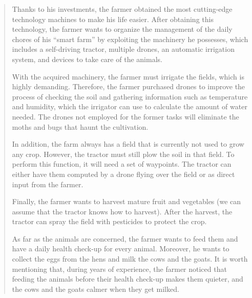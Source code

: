 \begin{quote}
Thanks to his investments, the farmer obtained the most cutting-edge technology machines to make his life easier.
After obtaining this technology, the farmer wants to organize the management of the daily chores of his ``smart farm'' by exploiting the machinery he possesses, which includes a self-driving tractor, multiple drones, an automatic irrigation system, and devices to take care of the animals.

With the acquired machinery, the farmer must irrigate the fields, which is highly demanding.
Therefore, the farmer purchased drones to improve the process of checking the soil and gathering information such as temperature and humidity, which the irrigator can use to calculate the amount of water needed.
The drones not employed for the former tasks will eliminate the moths and bugs that haunt the cultivation.

In addition, the farm always has a field that is currently not used to grow any crop.
However, the tractor must still plow the soil in that field.
To perform this function, it will need a set of waypoints.
The tractor can either have them computed by a drone flying over the field or as direct input from the farmer.

Finally, the farmer wants to harvest mature fruit and vegetables (we can assume that the tractor knows how to harvest).
After the harvest, the tractor can spray the field with pesticides to protect the crop.

As far as the animals are concerned, the farmer wants to feed them and have a daily health check-up for every animal. 
Moreover, he wants to collect the eggs from the hens and milk the cows and the goats.
It is worth mentioning that, during years of experience, the farmer noticed that feeding the animals before their health check-up makes them quieter, and the cows and the goats calmer when they get milked.
\end{quote}

